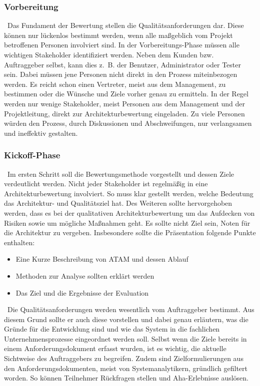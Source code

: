 \subsubsection{Vorbereitung}
\
Das Fundament der Bewertung stellen die Qualitätsanforderungen dar. Diese können nur lückenlos bestimmt werden, wenn alle maßgeblich vom Projekt betroffenen Personen involviert sind. In der Vorbereitungs-Phase müssen alle wichtigen Stakeholder identifiziert werden. Neben dem Kunden bzw. Auftraggeber selbst, kann dies z.~B. der Benutzer, Administrator oder Tester sein. Dabei müssen jene Personen nicht direkt in den Prozess miteinbezogen werden. Es reicht schon einen Vertreter, meist aus dem Management, zu bestimmen oder die Wünsche und Ziele vorher genau zu ermitteln. In der Regel werden nur wenige Stakeholder, meist Personen aus dem Management und der Projektleitung\cite{Starke2015}, direkt zur Architekturbewertung eingeladen. Zu viele Personen würden den Prozess, durch Diskussionen und Abschweifungen, nur verlangsamen und ineffektiv gestalten.
\subsubsection{Kickoff-Phase}
\
Im ersten Schritt soll die Bewertungsmethode vorgestellt und dessen Ziele verdeutlicht werden. Nicht jeder Stakeholder ist regelmäßig in eine Architekturbewertung involviert. So muss klar gestellt werden, welche Bedeutung das Architektur- und Qualitätsziel hat\cite{Starke2015}. Des Weiteren sollte hervorgehoben werden, dass es bei der qualitativen Architekturbewertung um das Aufdecken von Risiken sowie um mögliche Maßnahmen geht. Es sollte nicht Ziel sein, Noten für die Architektur zu vergeben. Insbesondere sollte die Präsentation folgende Punkte enthalten\cite{Clements2000}:

\begin{itemize}[]
	\item Eine Kurze Beschreibung von ATAM und dessen Ablauf
	\item Methoden zur Analyse sollten erklärt werden
	\item Das Ziel und die Ergebnisse der Evaluation
\end{itemize}

\
Die Qualitätsanforderungen werden wesentlich vom Auftraggeber bestimmt. Aus diesem Grund sollte er auch diese vorstellen und dabei genau erläutern, was die Gründe für die Entwicklung sind und wie das System in die fachlichen Unternehmensprozesse eingeordnet werden soll. Selbst wenn die Ziele bereits in einem Anforderungsdokument erfasst wurden, ist es wichtig, die aktuelle Sichtweise des Auftraggebers zu begreifen. Zudem sind Zielformulierungen aus den Anforderungsdokumenten, meist von Systemanalytikern, gründlich gefiltert worden\cite{Starke2015}. So können Teilnehmer Rückfragen stellen und Aha-Erlebnisse auslösen.

